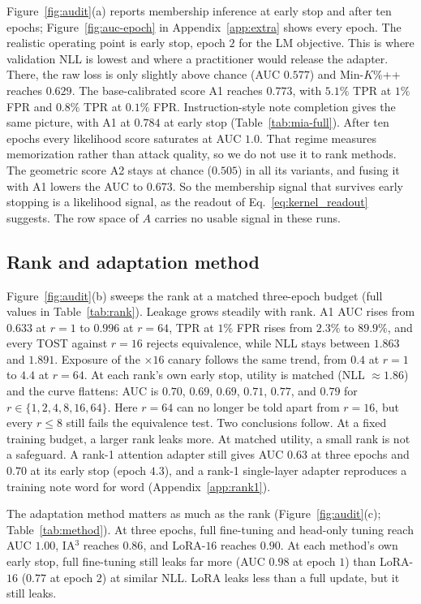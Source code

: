 \documentclass[11pt]{article}
\theoremstyle{plain}
\theoremstyle{definition}
\begin{document}
Figure~\ref{fig:audit}(a) reports membership inference at early stop and after ten epochs; Figure~\ref{fig:auc-epoch} in Appendix~\ref{app:extra} shows every epoch.
The realistic operating point is early stop, epoch $2$ for the LM objective. This is where validation NLL is lowest and where a practitioner would release the adapter.
There, the raw loss is only slightly above chance (AUC $0.577$) and Min-$K$\%++ reaches $0.629$.
The base-calibrated score A1 reaches $0.773$, with $5.1\%$ TPR at $1\%$ FPR and $0.8\%$ TPR at $0.1\%$ FPR.
Instruction-style note completion gives the same picture, with A1 at $0.784$ at early stop (Table~\ref{tab:mia-full}).
After ten epochs every likelihood score saturates at AUC $1.0$.
That regime measures memorization rather than attack quality, so we do not use it to rank methods.
The geometric score A2 stays at chance ($0.505$) in all its variants, and fusing it with A1 lowers the AUC to $0.673$.
So the membership signal that survives early stopping is a likelihood signal, as the readout of Eq.~\eqref{eq:kernel_readout} suggests. The row space of $A$ carries no usable signal in these runs.

\subsection{Rank and adaptation method}
\label{sec:results_rank}

Figure~\ref{fig:audit}(b) sweeps the rank at a matched three-epoch budget (full values in Table~\ref{tab:rank}).
Leakage grows steadily with rank. A1 AUC rises from $0.633$ at $r{=}1$ to $0.996$ at $r{=}64$, TPR at $1\%$ FPR rises from $2.3\%$ to $89.9\%$, and every TOST against $r{=}16$ rejects equivalence, while NLL stays between $1.863$ and $1.891$.
Exposure of the $\times16$ canary follows the same trend, from $0.4$ at $r{=}1$ to $4.4$ at $r{=}64$.
At each rank's own early stop, utility is matched (NLL ${\approx}1.86$) and the curve flattens: AUC is $0.70$, $0.69$, $0.69$, $0.71$, $0.77$, and $0.79$ for $r\in\{1,2,4,8,16,64\}$.
Here $r{=}64$ can no longer be told apart from $r{=}16$, but every $r\le8$ still fails the equivalence test.
Two conclusions follow.
At a fixed training budget, a larger rank leaks more.
At matched utility, a small rank is not a safeguard. A rank-1 attention adapter still gives AUC $0.63$ at three epochs and $0.70$ at its early stop (epoch $4.3$), and a rank-1 single-layer adapter reproduces a training note word for word (Appendix~\ref{app:rank1}).

The adaptation method matters as much as the rank (Figure~\ref{fig:audit}(c); Table~\ref{tab:method}).
At three epochs, full fine-tuning and head-only tuning reach AUC $1.00$, IA$^3$ reaches $0.86$, and LoRA-$16$ reaches $0.90$.
At each method's own early stop, full fine-tuning still leaks far more (AUC $0.98$ at epoch $1$) than LoRA-$16$ ($0.77$ at epoch $2$) at similar NLL.
LoRA leaks less than a full update, but it still leaks.
\end{document}
